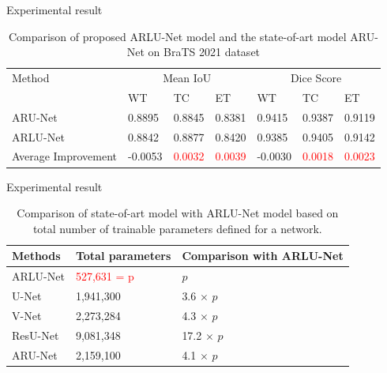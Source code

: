 \documentclass [xcolor=svgnames, t] {beamer}
\begin{document}
\begin{frame}{Experimental result}
\vspace*{\fill}
\begin{table}[H]
    \centering
    \caption{Comparison of proposed ARLU-Net model and the state-of-art model ARU-Net on BraTS 2021 dataset}
\begin{tabular}{ |p{2cm}|p{1.2cm}|p{1cm}|p{1cm}|p{1.2cm}|p{1cm}|p{1cm}|  }
\hline
Method & \multicolumn{3}{|c|}{Mean IoU} & \multicolumn{3}{|c|}{Dice Score} \\
\cline{2-7}
  & WT & TC & ET & WT & TC & ET\\
\hline
\hline
ARU-Net & 0.8895 & 0.8845 & 0.8381 & 0.9415 & 0.9387 & 0.9119\\
\hline
ARLU-Net & 0.8842 & 0.8877 & 0.8420 & 0.9385 & 0.9405 & 0.9142\\
\hline
Average Improvement & -0.0053 & \textcolor{red}{0.0032} & \textcolor{red}{0.0039} & -0.0030 & \textcolor{red}{0.0018} & \textcolor{red}{0.0023}\\
\hline
\end{tabular}
\end{table}
\vspace*{\fill}
\end{frame}


\begin{frame}{Experimental result}
\vspace*{\fill}
\begin{table}
\centering
\caption{Comparison of state-of-art model with ARLU-Net model based on total number of trainable parameters defined for a network.}
\label{table}
\setlength{\tabcolsep}{3pt}
\begin{tabular}{|l|l|l| }
\hline
\textbf{Methods} & \textbf{Total parameters} & \textbf{Comparison with ARLU-Net}\\
\hline
\hline
ARLU-Net & \textcolor{red}{527,631 = p} & $p$\\
\hline
U-Net & 1,941,300 & 3.6 $\times$ $p$  \\
\hline
V-Net & 2,273,284 &  4.3 $\times$ $p$\\
\hline
ResU-Net & 9,081,348 &  17.2 $\times$ $p$\\
\hline
ARU-Net & 2,159,100 &  4.1 $\times$ $p$\\
\hline
\end{tabular}
\end{table}
\vspace*{\fill}
\end{frame}
\end{document}
